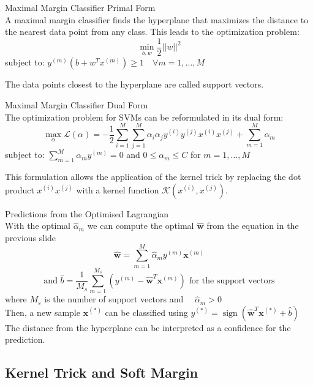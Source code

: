 \begin{definition}{Maximal Margin Classifier} Primal Form\\
    A maximal margin classifier finds the hyperplane that maximizes the distance to the nearest data point from any class. This leads to the optimization problem:
    \[\min_{b,w} \frac{1}{2}||w||^2\]
    subject to: $y^{(m)}(b + w^T x^{(m)}) \geq 1 \quad \forall m = 1,..., M$

    The data points closest to the hyperplane are called support vectors.
\end{definition}

\begin{concept}{Maximal Margin Classifier} Dual Form\\
The optimization problem for SVMs can be reformulated in its dual form:
\[\max_{\alpha} \mathcal{L}(\alpha) = - \frac{1}{2}\sum_{i=1}^{M}\sum_{j=1}^{M}\alpha_i\alpha_j y^{(i)}y^{(j)}x^{(i)}x^{(j)} + \sum_{m=1}^{M}\alpha_m\]
subject to: $\sum_{m=1}^{M}\alpha_m y^{(m)} = 0$ and $0 \leq \alpha_m \leq C$ for $m = 1, ..., M$

This formulation allows the application of the kernel trick by replacing the dot product $x^{(i)}x^{(j)}$ with a kernel function $\mathcal{K}(x^{(i)}, x^{(j)})$.
\end{concept}

\begin{theorem}{Predictions from the Optimised Lagrangian}\\
    With the optimal $\hat{\alpha}_m$ we can compute the optimal $\widehat{\mathbf{w}}$ from the equation in the previous slide
    \[ \widehat{\mathbf{w}}=\sum_{m=1}^M \hat{\alpha}_m y^{(m)} \mathbf{x}^{(m)} \]
    \[ \text{and }\hat{b}=\frac{1}{M_s} \sum_{m=1}^{M_s}\left(y^{(m)}-\widehat{\mathbf{w}}^T \mathbf{x}^{(m)}\right) \text{ for the support vectors}\]
    where $M_s$ is the number of support vectors and $\quad \hat{\alpha}_m>0$
    \vspace{2mm}\\
    Then, a new sample $\mathbf{x}^{(*)}$ can be classified using $y^{(*)}=\operatorname{sign}(\widehat{\mathbf{w}}^T \mathbf{x}^{(*)}+\hat{b})$
    The distance from the hyperplane can be interpreted as a confidence for the prediction.
\end{theorem}

\subsection{Kernel Trick and Soft Margin}

